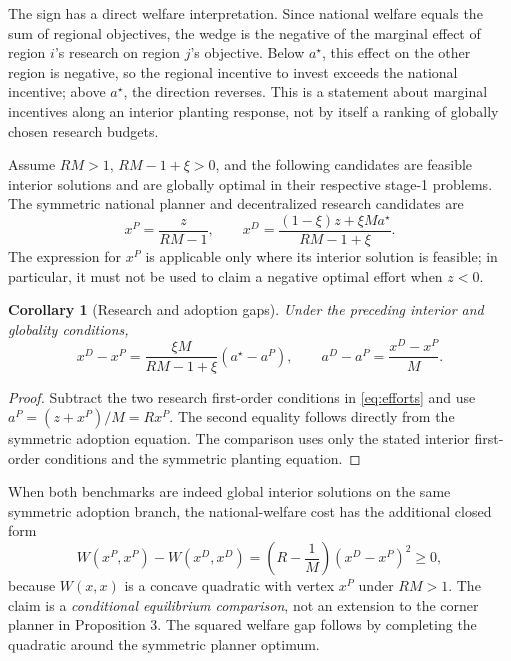 \documentclass[11pt,a4paper]{article}
\newtheorem{corollary}{Corollary}
\begin{document}
The sign has a direct welfare interpretation. Since national welfare equals the sum of regional objectives, the wedge is the negative of the marginal effect of region $i$'s research on region $j$'s objective. Below $a^\star$, this effect on the other region is negative, so the regional incentive to invest exceeds the national incentive; above $a^\star$, the direction reverses. This is a statement about marginal incentives along an interior planting response, not by itself a ranking of globally chosen research budgets.

Assume $RM>1$, $RM-1+\xi>0$, and the following candidates are feasible interior solutions and are globally optimal in their respective stage-1 problems. The symmetric national planner and decentralized research candidates are
\begin{equation}
 x^P=\frac{z}{RM-1},\qquad
 x^D=\frac{(1-\xi)z+\xi M a^\star}{RM-1+\xi}.
 \label{eq:efforts}
\end{equation}
The expression for $x^P$ is applicable only where its interior solution is feasible; in particular, it must not be used to claim a negative optimal effort when $z<0$.

\begin{corollary}[Research and adoption gaps]
Under the preceding interior and globality conditions,
\begin{equation}
 x^D-x^P=\frac{\xi M}{RM-1+\xi}(a^\star-a^P),
 \qquad a^D-a^P=\frac{x^D-x^P}{M}.
 \label{eq:corollary}
\end{equation}
\end{corollary}
\begin{proof}
Subtract the two research first-order conditions in \eqref{eq:efforts} and use $a^P=(z+x^P)/M=Rx^P$. The second equality follows directly from the symmetric adoption equation. The comparison uses only the stated interior first-order conditions and the symmetric planting equation.
\end{proof}

When both benchmarks are indeed global interior solutions on the same symmetric adoption branch, the national-welfare cost has the additional closed form
\begin{equation}
W(x^P,x^P)-W(x^D,x^D)
=\left(R-\frac{1}{M}\right)(x^D-x^P)^2\geq0,
\label{eq:interiorwelfarecost}
\end{equation}
because $W(x,x)$ is a concave quadratic with vertex $x^P$ under $RM>1$. The claim is a \emph{conditional equilibrium comparison}, not an extension to the corner planner in Proposition 3. The squared welfare gap follows by completing the quadratic around the symmetric planner optimum.
\end{document}
